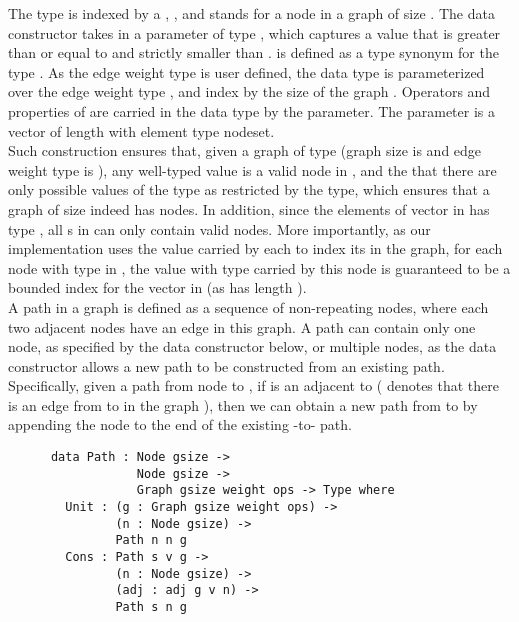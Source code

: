 The  type is indexed by a , , and stands for a node in a graph of size . The data constructor  takes in a parameter of type , which captures a  value that is greater than or equal to  and strictly smaller than .  is defined as a type synonym for the type . As the edge weight type is user defined, the  data type is parameterized over the edge weight type , and index by the size of the graph . Operators and properties of  are carried in the  data type by the  parameter. The  parameter is a vector of length  with element type {nodeset}. 
\\

Such construction ensures that, given a graph  of type  (graph size is  and edge weight type is ), any well-typed  value is a valid node in , and the that there are only  possible values of the type  as restricted by the  type, which ensures that a graph of size  indeed has  nodes. In addition, since the elements of vector  in  has type , all s in  can only contain valid nodes. More importantly, as our implementation uses the value carried by each  to index its  in the graph, for each node with type  in , the value with type  carried by this node is guaranteed to be a bounded index for the vector  in  (as  has length ). 
\\

A path in a graph is defined as a sequence of non-repeating nodes, where each two adjacent nodes have an edge in this graph. A path can contain only one node, as specified by the  data constructor below, or multiple nodes, as the  data constructor allows a new path to be constructed from an existing path. Specifically, given a path from node  to , if  is an adjacent to  ( denotes that there is an edge from  to  in the graph ), then we can obtain a new path from  to  by appending the node  to the end of the existing -to- path. 

\begin{lstlisting}
      data Path : Node gsize ->
                  Node gsize ->
                  Graph gsize weight ops -> Type where
        Unit : (g : Graph gsize weight ops) ->
               (n : Node gsize) ->
               Path n n g
        Cons : Path s v g ->
               (n : Node gsize) ->
               (adj : adj g v n) ->
               Path s n g
\end{lstlisting}

